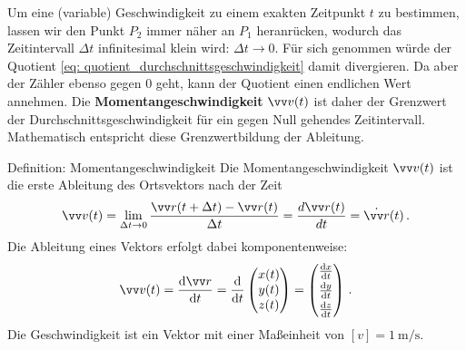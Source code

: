 Um eine (variable) Geschwindigkeit zu einem exakten Zeitpunkt $t$ zu bestimmen, lassen wir den Punkt $P_2$ immer näher an $P_1$ heranrücken, wodurch das Zeitintervall $\Delta t$ infinitesimal klein wird: $\Delta t \to 0$. Für sich genommen würde der Quotient \cref{eq: quotient_durchschnittsgeschwindigkeit} damit divergieren. Da aber der Zähler ebenso gegen $0$ geht, kann der Quotient einen endlichen Wert annehmen. Die \textbf{Momentangeschwindigkeit} $\ivec{v}(t)$ ist daher der Grenzwert der Durchschnittsgeschwindigkeit für ein gegen Null gehendes Zeitintervall. Mathematisch entspricht diese Grenzwertbildung der Ableitung.

\begin{importantbox}{Definition: Momentangeschwindigkeit}
    Die Momentangeschwindigkeit $\ivec{v}(t)$ ist die erste Ableitung des Ortsvektors nach der Zeit
    \begin{equation}\label{eq: def_momentangeschwindigkeit}
        \ivec{v}(t) = \lim_{\Delta t\to0}\frac{\ivec{r}(t+\Delta t)-\ivec{r}(t)}{\Delta t} = \frac{d\ivec{r}(t)}{dt} = \dot{\ivec{r}}(t)\mDot
    \end{equation}
    Die Ableitung eines Vektors erfolgt dabei komponentenweise:
    \begin{equation}
        \ivec{v}(t) = \frac{\dd\ivec{r}}{\dd t} = \frac{\dd}{\dd t}\icolThree{x(t)}{y(t)}{z(t)} = \begin{pmatrix}
            \frac{\dd x}{\dd t} \\[2.5pt]
            \frac{\dd y}{\dd t} \\[2.5pt]
            \frac{\dd z}{\dd t}
        \end{pmatrix}\mDot
    \end{equation}
    Die Geschwindigkeit ist ein Vektor mit einer Maßeinheit von $[v] = \SI{1}{\meter\per\second}$. 
\end{importantbox}
